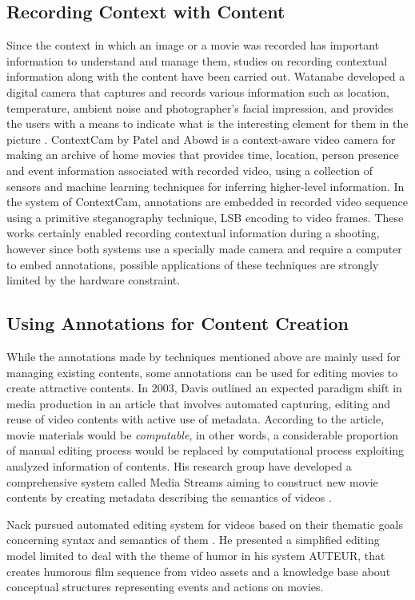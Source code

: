 \subsection{Recording Context with Content}
Since the context in which an image or a movie was recorded has important information to understand and manage them, studies on recording contextual information along with the content have been carried out.
Watanabe developed a digital camera that captures and records various information such as location, temperature, ambient noise and photographer's facial impression, and provides the users with a means to indicate what is the interesting element for them in the picture \cite{Watanabe:2007:WDC:1240866.1241073}.
ContextCam by Patel and Abowd \cite{Patel04thecontextcam:} is a context-aware video camera for making an archive of home movies that provides time, location, person presence and event information associated with recorded video, using a collection of sensors and machine learning techniques for inferring higher-level information.
In the system of ContextCam, annotations are embedded in recorded video sequence using a primitive steganography technique, LSB encoding to video frames.
These works certainly enabled recording contextual information during a shooting, however since both systems use a specially made camera and require a computer to embed annotations, possible applications of these techniques are strongly limited by the hardware constraint.

\subsection{Using Annotations for Content Creation}
While the annotations made by techniques mentioned above are mainly used for managing existing contents, some annotations can be used for editing movies to create attractive contents.
In 2003, Davis outlined an expected paradigm shift in media production in an article \cite{davis2003editing} that involves automated capturing, editing and reuse of video contents with active use of metadata.
According to the article, movie materials would be {\it computable}, in other words, a considerable proportion of manual editing process would be replaced by computational process exploiting analyzed information of contents.
His research group have developed a comprehensive system called Media Streams aiming to construct new movie contents by creating metadata describing the semantics of videos \cite{davis2000media}.

Nack pursued automated editing system for videos based on their thematic goals concerning syntax and semantics of them \cite{nack1997application}.
He presented a simplified editing model limited to deal with the theme of humor in his system AUTEUR, that creates humorous film sequence from video assets and a knowledge base about conceptual structures representing events and actions on movies.
